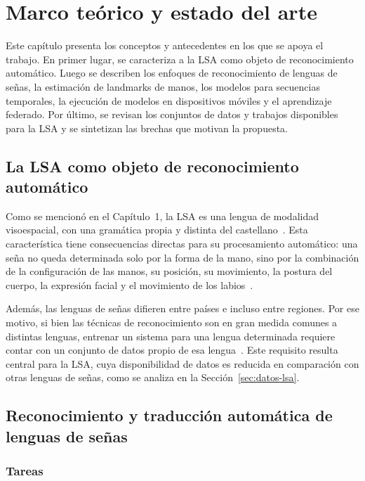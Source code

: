 \chapter{Marco teórico y estado del arte}

Este capítulo presenta los conceptos y antecedentes en los que se apoya el trabajo. En primer lugar, se caracteriza a la LSA como objeto de reconocimiento automático. Luego se describen los enfoques de reconocimiento de lenguas de señas, la estimación de landmarks de manos, los modelos para secuencias temporales, la ejecución de modelos en dispositivos móviles y el aprendizaje federado. Por último, se revisan los conjuntos de datos y trabajos disponibles para la LSA y se sintetizan las brechas que motivan la propuesta.

\section{La LSA como objeto de reconocimiento automático}

Como se mencionó en el Capítulo~1, la LSA es una lengua de modalidad visoespacial, con una gramática propia y distinta del castellano~\cite{ley27710}. Esta característica tiene consecuencias directas para su procesamiento automático: una seña no queda determinada solo por la forma de la mano, sino por la combinación de la configuración de las manos, su posición, su movimiento, la postura del cuerpo, la expresión facial y el movimiento de los labios~\cite{ronchetti2016lsa64}.

Además, las lenguas de señas difieren entre países e incluso entre regiones. Por ese motivo, si bien las técnicas de reconocimiento son en gran medida comunes a distintas lenguas, entrenar un sistema para una lengua determinada requiere contar con un conjunto de datos propio de esa lengua~\cite{ronchetti2016lsa64}. Este requisito resulta central para la LSA, cuya disponibilidad de datos es reducida en comparación con otras lenguas de señas, como se analiza en la Sección~\ref{sec:datos-lsa}.

\section{Reconocimiento y traducción automática de lenguas de señas}

\subsection{Tareas}

